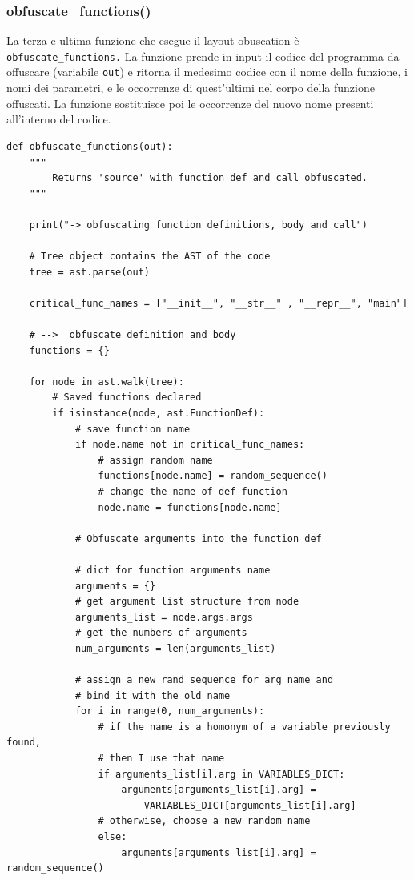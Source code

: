 \documentclass[a4paper,oneside,openright,titlepage,10pt,footinclude,headinclude]{scrbook}
\begin{document}
\subsubsection{obfuscate\_functions()}
La terza e ultima funzione che esegue il layout obuscation è \\ \texttt{obfuscate\_functions.}
La funzione prende in input il codice del programma da offuscare (variabile \texttt{out}) e ritorna il medesimo codice con il nome della funzione, i nomi dei parametri, e le occorrenze di quest'ultimi nel corpo della funzione offuscati. La funzione sostituisce poi le occorrenze del nuovo nome presenti all'interno del codice.\medskip
\begin{graybox}[innerleftmargin=2,]
\begin{lstlisting}
def obfuscate_functions(out):
    """
        Returns 'source' with function def and call obfuscated.
    """

    print("-> obfuscating function definitions, body and call")

    # Tree object contains the AST of the code
    tree = ast.parse(out)

    critical_func_names = ["__init__", "__str__" , "__repr__", "main"]

    # -->  obfuscate definition and body
    functions = {}

    for node in ast.walk(tree):
        # Saved functions declared
        if isinstance(node, ast.FunctionDef):
            # save function name
            if node.name not in critical_func_names:
                # assign random name
                functions[node.name] = random_sequence()
                # change the name of def function
                node.name = functions[node.name]

            # Obfuscate arguments into the function def

            # dict for function arguments name
            arguments = {}
            # get argument list structure from node
            arguments_list = node.args.args
            # get the numbers of arguments
            num_arguments = len(arguments_list)

            # assign a new rand sequence for arg name and
            # bind it with the old name
            for i in range(0, num_arguments):
                # if the name is a homonym of a variable previously found,
                # then I use that name
                if arguments_list[i].arg in VARIABLES_DICT:
                    arguments[arguments_list[i].arg] = 
                        VARIABLES_DICT[arguments_list[i].arg]
                # otherwise, choose a new random name
                else:
                    arguments[arguments_list[i].arg] = random_sequence()


\end{lstlisting}
\end{graybox}
\end{document}
